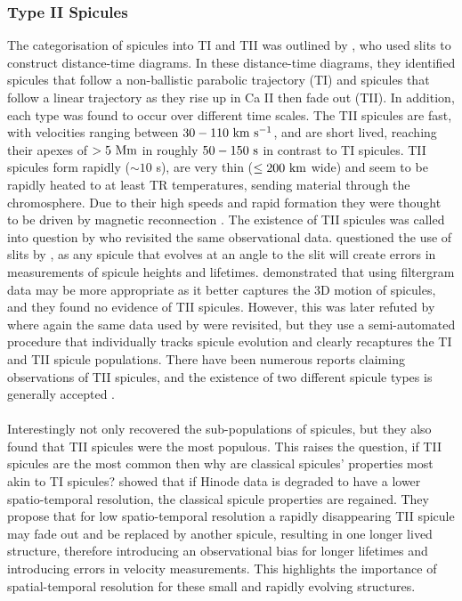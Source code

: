 \documentclass[12pt]{ociamthesis}
\newcommand{\kms}{~\rm{km ~s^{-1}}}
\newcommand{\np}{\\ \\}
\begin{document}
\subsubsection{Type II Spicules}
\label{subsec:TII}
The categorisation of spicules into TI and TII was outlined by \cite{Pontieu2007PASJ}, who used slits to construct distance-time diagrams. In these distance-time diagrams, they identified spicules that follow a non-ballistic parabolic trajectory (TI) and spicules that follow a linear trajectory as they rise up in Ca II then fade out (TII). In addition, each type was found to occur over different time scales. The TII spicules are fast, with velocities ranging between $30-110\kms$, and are short lived, reaching their apexes of $>5~\rm{Mm}$ in roughly $50-150~\rm{s}$ in contrast to TI spicules. TII spicules form rapidly ($\sim 10$ s), are very thin ($\leq 200~\rm{km}$ wide) and seem to be rapidly heated to at least TR temperatures, sending material through the chromosphere. Due to their high speeds and rapid formation they were thought to be driven by magnetic reconnection \citep{Pontieu2007PASJ}. The existence of TII spicules was called into question by \cite{Zhang2012ApJ} who revisited the same observational data. \cite{Zhang2012ApJ} questioned the use of slits by \cite{Pontieu2007PASJ}, as any spicule that evolves at an angle to the slit will create errors in measurements of spicule heights and lifetimes. \cite{Zhang2012ApJ} demonstrated that using filtergram data may be more appropriate as it better captures the 3D motion of spicules, and they found no evidence of TII spicules. However, this was later refuted by \cite{Pereira2012} where again the same data used by \cite{Pontieu2007PASJ} were revisited, but they use a semi-automated procedure that individually tracks spicule evolution and clearly recaptures the TI and TII spicule populations. There have been numerous reports claiming observations of TII spicules, and the existence of two different spicule types is generally accepted \citep{Rouppe2009ApJ, Rouppe2015ApJ799L3R, Shetye2016AA589A3S, Rutten2019AA632A96R, Yurchyshyn2020ApJ891L21Y, Chintzoglou2021ApJ90682C}. \np   
%
Interestingly \cite{Pereira2012} not only recovered the sub-populations of spicules, but they also found that TII spicules were the most populous. This raises the question, if TII spicules are the most common then why are classical spicules' properties most akin to TI spicules? \cite{Pereira2013ApJ76469P} showed that if Hinode data is degraded to have a lower spatio-temporal resolution, the classical spicule properties are regained. They propose that for low spatio-temporal resolution a rapidly disappearing TII spicule may fade out and be replaced by another spicule, resulting in one longer lived structure, therefore introducing an observational bias for longer lifetimes and introducing errors in velocity measurements. This highlights the importance of spatial-temporal resolution for these small and rapidly evolving structures.\np
\end{document}
